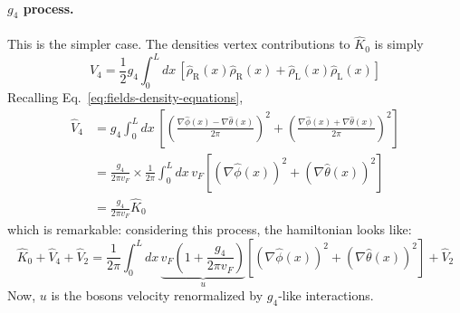 \paragraph{$g_4$ process.} This is the simpler case. The densities vertex contributions to $\hat K_0$ is simply
\[
	\hat V_4 = \frac{1}{2} g_4 \int_0^L dx \, \left[ \hat \rho_\mathrm{R} (x) \hat \rho_\mathrm{R} (x) + \hat \rho_\mathrm{L} (x) \hat \rho_\mathrm{L} (x) \right]
\]
Recalling Eq.~\eqref{eq:fields-density-equations},
\[
\begin{aligned}
	\hat V_4 &= g_4 \int_0^L dx \, \left[ \left( \frac{\nabla \hat \phi(x) - \nabla \hat \theta(x)}{2\pi} \right)^2 + \left( \frac{\nabla \hat \phi(x) + \nabla \hat \theta(x)}{2\pi} \right)^2 \right] \\
	&= \frac{g_4}{2\pi v_F} \times \frac{1}{2\pi} \int_0^L dx \, v_F \left[ \left( \nabla \hat \phi(x) \right)^2 + \left( \nabla \hat \theta(x) \right)^2 \right] \\
	&= \frac{g_4}{2\pi v_F} \hat K_0
\end{aligned}
\]
which is remarkable: considering this process, the hamiltonian looks like:
\[
	\hat K_0 + \hat V_4 + \hat V_2 = \frac{1}{2\pi} \int_0^L dx \, \underbrace{v_F \left( 1 + \frac{g_4}{2\pi v_F} \right)}_{u} \left[ \left( \nabla \hat \phi(x) \right)^2 + \left( \nabla \hat \theta(x) \right)^2 \right] + \hat V_2
\]
Now, $u$ is the bosons velocity renormalized by $g_4$-like interactions.

